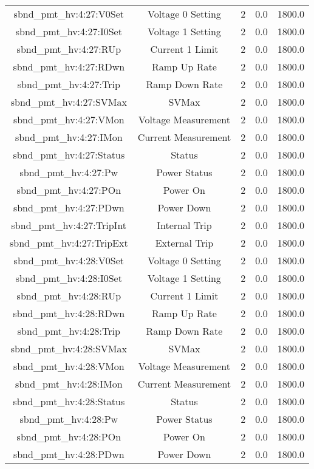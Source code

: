 \begin{center}
\begin{longtable}{c | c c c c }
sbnd\_pmt\_hv:4:27:V0Set & Voltage 0 Setting & 2 & 0.0 & 1800.0\\ 
sbnd\_pmt\_hv:4:27:I0Set & Voltage 1 Setting & 2 & 0.0 & 1800.0\\ 
sbnd\_pmt\_hv:4:27:RUp & Current 1 Limit & 2 & 0.0 & 1800.0\\ 
sbnd\_pmt\_hv:4:27:RDwn & Ramp Up Rate & 2 & 0.0 & 1800.0\\ 
sbnd\_pmt\_hv:4:27:Trip & Ramp Down Rate & 2 & 0.0 & 1800.0\\ 
sbnd\_pmt\_hv:4:27:SVMax & SVMax & 2 & 0.0 & 1800.0\\ 
sbnd\_pmt\_hv:4:27:VMon & Voltage Measurement & 2 & 0.0 & 1800.0\\ 
sbnd\_pmt\_hv:4:27:IMon & Current Measurement & 2 & 0.0 & 1800.0\\ 
sbnd\_pmt\_hv:4:27:Status & Status & 2 & 0.0 & 1800.0\\ 
sbnd\_pmt\_hv:4:27:Pw & Power Status & 2 & 0.0 & 1800.0\\ 
sbnd\_pmt\_hv:4:27:POn & Power On & 2 & 0.0 & 1800.0\\ 
sbnd\_pmt\_hv:4:27:PDwn & Power Down & 2 & 0.0 & 1800.0\\ 
sbnd\_pmt\_hv:4:27:TripInt & Internal Trip & 2 & 0.0 & 1800.0\\ 
sbnd\_pmt\_hv:4:27:TripExt & External Trip & 2 & 0.0 & 1800.0\\ 
sbnd\_pmt\_hv:4:28:V0Set & Voltage 0 Setting & 2 & 0.0 & 1800.0\\ 
sbnd\_pmt\_hv:4:28:I0Set & Voltage 1 Setting & 2 & 0.0 & 1800.0\\ 
sbnd\_pmt\_hv:4:28:RUp & Current 1 Limit & 2 & 0.0 & 1800.0\\ 
sbnd\_pmt\_hv:4:28:RDwn & Ramp Up Rate & 2 & 0.0 & 1800.0\\ 
sbnd\_pmt\_hv:4:28:Trip & Ramp Down Rate & 2 & 0.0 & 1800.0\\ 
sbnd\_pmt\_hv:4:28:SVMax & SVMax & 2 & 0.0 & 1800.0\\ 
sbnd\_pmt\_hv:4:28:VMon & Voltage Measurement & 2 & 0.0 & 1800.0\\ 
sbnd\_pmt\_hv:4:28:IMon & Current Measurement & 2 & 0.0 & 1800.0\\ 
sbnd\_pmt\_hv:4:28:Status & Status & 2 & 0.0 & 1800.0\\ 
sbnd\_pmt\_hv:4:28:Pw & Power Status & 2 & 0.0 & 1800.0\\ 
sbnd\_pmt\_hv:4:28:POn & Power On & 2 & 0.0 & 1800.0\\ 
sbnd\_pmt\_hv:4:28:PDwn & Power Down & 2 & 0.0 & 1800.0\\ 

\end{longtable}
\end{center}
